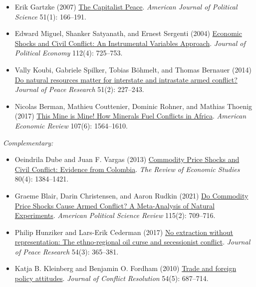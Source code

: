 \documentclass[12pt, a4paper]{article}
\begin{document}
\begin{itemize}
  \item Erik Gartzke (2007) \href{https://doi.org/10.1111/j.1540-5907.2007.00244.x}{The Capitalist Peace}. \textit{American Journal of Political Science} 51(1): 166--191.
	\item Edward Miguel, Shanker Satyanath, and Ernest Sergenti (2004) \href{https://doi.org/10.1086/421174}{Economic Shocks and Civil Conflict: An Instrumental Variables Approach}. \textit{Journal of Political Economy} 112(4): 725--753.
	\item Vally Koubi, Gabriele Spilker, Tobias Böhmelt, and Thomas Bernauer (2014) \href{https://doi.org/10.1177/002234331349345}{Do natural resources matter for interstate and intrastate armed conflict?} \textit{Journal of Peace Research} 51(2): 227--243.
	\item Nicolas Berman, Mathieu Couttenier, Dominic Rohner, and Mathias Thoenig (2017) \href{https://doi.org/10.1257/aer.20150774}{This Mine is Mine! How Minerals Fuel Conflicts in Africa}. \textit{American Economic Review} 107(6): 1564--1610.
\end{itemize}

\noindent\textit{Complementary:}

\begin{itemize}
	\item Oeindrila Dube and Juan F. Vargas (2013) \href{https://doi.org/10.1093/restud/rdt009}{Commodity Price Shocks and Civil Conflict: Evidence from Colombia}. \textit{The Review of Economic Studies} 80(4): 1384--1421.
	\item Graeme Blair, Darin Christensen, and Aaron Rudkin (2021) \href{https://doi.org/10.1017/S0003055420000957}{Do Commodity Price Shocks Cause Armed Conflict? A Meta-Analysis of Natural Experiments}. \textit{American Political Science Review} 115(2): 709--716.
	\item Philip Hunziker and Lars-Erik Cederman (2017) \href{https://doi.org/10.1177/0022343316687365}{No extraction without representation: The ethno-regional oil curse and secessionist conflict}. \textit{Journal of Peace Research} 54(3): 365--381.
	\item Katja B. Kleinberg and Benjamin O. Fordham (2010) \href{https://doi.org/10.1177/0022002710364128}{Trade and foreign policy attitudes}. \textit{Journal of Conflict Resolution} 54(5): 687--714.
\end{itemize}
\end{document}
